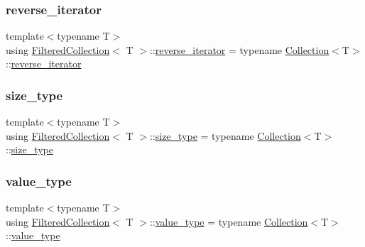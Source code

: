 \mbox{\label{class_filtered_collection_a5b0a5b053f47e55eee9d746d8160664b}} 
\subsubsection{\texorpdfstring{reverse\+\_\+iterator}{reverse\_iterator}}
{\footnotesize\ttfamily template$<$typename T$>$ \\
using \hyperlink{class_filtered_collection}{Filtered\+Collection}$<$ T $>$\+::\hyperlink{class_collection_ac3805407b2dc537e71db7af070b8d8a6}{reverse\+\_\+iterator} =  typename \hyperlink{class_collection}{Collection}$<$T$>$\+::\hyperlink{class_collection_ac3805407b2dc537e71db7af070b8d8a6}{reverse\+\_\+iterator}}

\mbox{\label{class_filtered_collection_ab527ec70d0bf74af7018c0ca42a6ec8a}} 
\subsubsection{\texorpdfstring{size\+\_\+type}{size\_type}}
{\footnotesize\ttfamily template$<$typename T$>$ \\
using \hyperlink{class_filtered_collection}{Filtered\+Collection}$<$ T $>$\+::\hyperlink{class_collection_a3f8b024f587aa20be530866da30948c4}{size\+\_\+type} =  typename \hyperlink{class_collection}{Collection}$<$T$>$\+::\hyperlink{class_collection_a3f8b024f587aa20be530866da30948c4}{size\+\_\+type}}

\mbox{\label{class_filtered_collection_a70364ecb37ecfcc313cea1e3dee900da}} 
\subsubsection{\texorpdfstring{value\+\_\+type}{value\_type}}
{\footnotesize\ttfamily template$<$typename T$>$ \\
using \hyperlink{class_filtered_collection}{Filtered\+Collection}$<$ T $>$\+::\hyperlink{class_collection_a30ecb2b5696f341f4b751019679c41e0}{value\+\_\+type} =  typename \hyperlink{class_collection}{Collection}$<$T$>$\+::\hyperlink{class_collection_a30ecb2b5696f341f4b751019679c41e0}{value\+\_\+type}}



